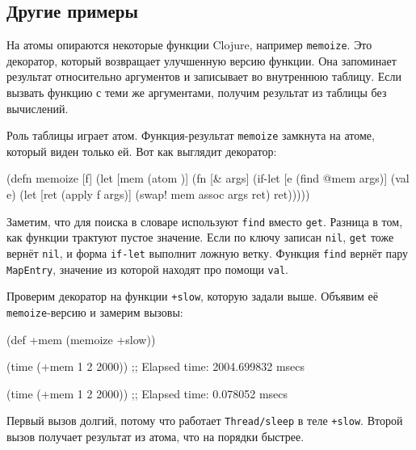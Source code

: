 \subsection{Другие примеры}


На атомы опираются некоторые функции Clojure, например \verb|memoize|. Это
декоратор, который возвращает улучшенную версию функции. Она запоминает
результат относительно аргументов и записывает во внутреннюю таблицу. Если
вызвать функцию с теми же аргументами, получим результат из таблицы без
вычислений.

Роль таблицы играет атом. Функция-результат \verb|memoize| замкнута на атоме,
который виден только ей. Вот как выглядит декоратор:

\begin{english}
  \begin{clojure}
(defn memoize [f]
  (let [mem (atom {})]
    (fn [& args]
      (if-let [e (find @mem args)]
        (val e)
        (let [ret (apply f args)]
          (swap! mem assoc args ret)
          ret)))))
  \end{clojure}
\end{english}


Заметим, что для поиска в словаре используют \verb|find| вместо
\verb|get|. Разница в том, как функции трактуют пустое значение. Если по ключу
записан \verb|nil|, \verb|get| тоже вернёт \verb|nil|, и форма
\verb|if-let| выполнит ложную ветку. Функция \verb|find| вернёт пару
\verb|MapEntry|, значение из которой находят про помощи \verb|val|.

Проверим декоратор на функции \verb|+slow|, которую задали выше. Объявим её
\verb|memoize|-версию и замерим вызовы:

\begin{english}
  \begin{clojure}
(def +mem (memoize +slow))

(time (+mem 1 2 2000))
;; Elapsed time: 2004.699832 msecs

(time (+mem 1 2 2000))
;; Elapsed time: 0.078052 msecs
  \end{clojure}
\end{english}


Первый вызов долгий, потому что работает \verb|Thread/sleep| в теле
\verb|+slow|. Второй вызов получает результат из атома, что на порядки
быстрее.

